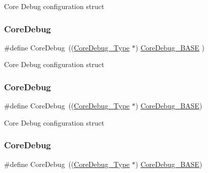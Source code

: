 Core Debug configuration struct \mbox{\label{group___c_m_s_i_s__core__base_gab6e30a2b802d9021619dbb0be7f5d63d}} 
\subsubsection{\texorpdfstring{CoreDebug}{CoreDebug}\hspace{0.1cm}{\footnotesize\ttfamily [2/8]}}
{\footnotesize\ttfamily \#define Core\+Debug~((\mbox{\hyperlink{struct_core_debug___type}{Core\+Debug\+\_\+\+Type}} $\ast$)     \mbox{\hyperlink{group___c_m_s_i_s__core__base_ga680604dbcda9e9b31a1639fcffe5230b}{Core\+Debug\+\_\+\+B\+A\+SE}}   )}

Core Debug configuration struct \mbox{\label{group___c_m_s_i_s__core__base_gab6e30a2b802d9021619dbb0be7f5d63d}} 
\subsubsection{\texorpdfstring{CoreDebug}{CoreDebug}\hspace{0.1cm}{\footnotesize\ttfamily [3/8]}}
{\footnotesize\ttfamily \#define Core\+Debug~((\mbox{\hyperlink{struct_core_debug___type}{Core\+Debug\+\_\+\+Type}} $\ast$)     \mbox{\hyperlink{group___c_m_s_i_s__core__base_ga680604dbcda9e9b31a1639fcffe5230b}{Core\+Debug\+\_\+\+B\+A\+SE}})}

Core Debug configuration struct \mbox{\label{group___c_m_s_i_s__core__base_gab6e30a2b802d9021619dbb0be7f5d63d}} 
\subsubsection{\texorpdfstring{CoreDebug}{CoreDebug}\hspace{0.1cm}{\footnotesize\ttfamily [4/8]}}
{\footnotesize\ttfamily \#define Core\+Debug~((\mbox{\hyperlink{struct_core_debug___type}{Core\+Debug\+\_\+\+Type}} $\ast$)     \mbox{\hyperlink{group___c_m_s_i_s__core__base_ga680604dbcda9e9b31a1639fcffe5230b}{Core\+Debug\+\_\+\+B\+A\+SE}})}

